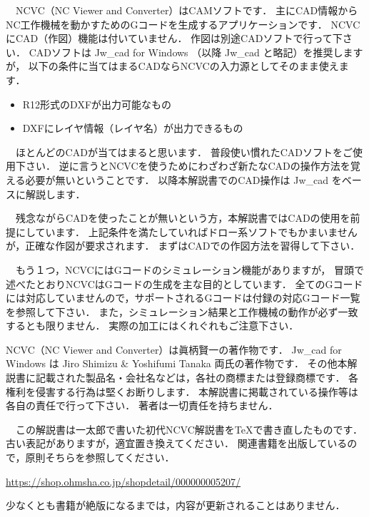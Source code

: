 

\vspace*{2zh}
　NCVC（NC Viewer and Converter）はCAMソフトです．
主にCAD情報からNC工作機械を動かすためのGコードを生成するアプリケーションです．
NCVCにCAD（作図）機能は付いていません．
作図は別途CADソフトで行って下さい．
CADソフトは Jw\_cad for Windows （以降 Jw\_cad と略記）を推奨しますが，
以下の条件に当てはまるCADならNCVCの入力源としてそのまま使えます．

\begin{itemize}
    \item R12形式のDXFが出力可能なもの
    \item DXFにレイヤ情報（レイヤ名）が出力できるもの
\end{itemize}

　ほとんどのCADが当てはまると思います．
普段使い慣れたCADソフトをご使用下さい．
逆に言うとNCVCを使うためにわざわざ新たなCADの操作方法を覚える必要が無いということです．
以降本解説書でのCAD操作は Jw\_cad をベースに解説します．

　残念ながらCADを使ったことが無いという方，本解説書ではCADの使用を前提にしています．
上記条件を満たしていればドロー系ソフトでもかまいませんが，正確な作図が要求されます．
まずはCADでの作図方法を習得して下さい．

　もう１つ，NCVCにはGコードのシミュレーション機能がありますが，
冒頭で述べたとおりNCVCはGコードの生成を主な目的としています．
全てのGコードには対応していませんので，サポートされるGコードは付録の対応Gコード一覧を参照して下さい．
また，シミュレーション結果と工作機械の動作が必ず一致するとも限りません．
実際の加工にはくれぐれもご注意下さい．

\vspace*{2zh}
\begin{center}
\begin{minipage}{10cm}
\begin{screen}
NCVC（NC Viewer and Converter）は眞柄賢一の著作物です．
Jw\_cad for Windows は Jiro Shimizu \& Yoshifumi Tanaka 両氏の著作物です．
その他本解説書に記載された製品名・会社名などは，各社の商標または登録商標です．
各権利を侵害する行為は堅くお断りします．
本解説書に掲載されている操作等は各自の責任で行って下さい．
著者は一切責任を持ちません．  
\end{screen}
\end{minipage}
\end{center}

\vspace*{2zh}
\begin{boxnote}
　この解説書は一太郎で書いた初代NCVC解説書をTeXで書き直したものです．
古い表記がありますが，適宜置き換えてください．
関連書籍を出版しているので，原則そちらを参照してください．
\begin{center}
\url{https://shop.ohmsha.co.jp/shopdetail/000000005207/}
\end{center}
少なくとも書籍が絶版になるまでは，内容が更新されることはありません．
\end{boxnote}
